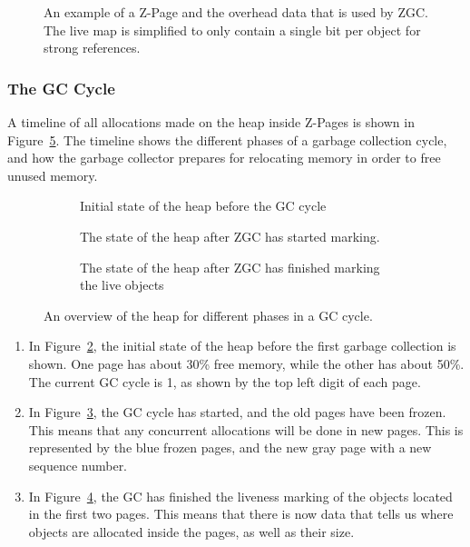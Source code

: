 \begin{figure}[H]
    \centering
    
    \caption[]
    {An example of a Z-Page and the overhead data that is used by ZGC. The live map is simplified to only contain a single bit per object for strong references.} 
    \label{fig:zpages}
\end{figure}

\subsubsection{The GC Cycle}

A timeline of all allocations made on the heap inside Z-Pages is shown in Figure~\ref{fig:zgc_timeline}. The timeline shows the different phases of a garbage collection cycle, and how the garbage collector prepares for relocating memory in order to free unused memory.

\begin{figure}[H]
    \centering
    \begin{subfigure}[t]{.214\textwidth}
        \centering
        
        \caption{Initial state of the heap before the GC cycle}
        \label{fig:zrel1}
    \end{subfigure}%
    \hfill\vline\hfill
    \begin{subfigure}[t]{.32\textwidth}
        \centering
        
        \caption{The state of the heap after ZGC has started marking.}
        \label{fig:zrel2}
    \end{subfigure}%
    \hfill\vline\hfill
    \begin{subfigure}[t]{.32\textwidth}
        \centering
        
        \caption{The state of the heap after ZGC has finished marking the live objects}
        \label{fig:zrel3}
    \end{subfigure}%
    \caption{An overview of the heap for different phases in a GC cycle.}
    \label{fig:zgc_timeline}
\end{figure}

\begin{enumerate}
    \item In Figure~\ref*{fig:zrel1}, the initial state of the heap before the first garbage collection is shown. One page has about 30\% free memory, while the other has about 50\%. The current GC cycle is 1, as shown by the top left digit of each page.
    \item In Figure~\ref*{fig:zrel2}, the GC cycle has started, and the old pages have been frozen. This means that any concurrent allocations will be done in new pages. This is represented by the blue frozen pages, and the new gray page with a new sequence number.
    \item In Figure~\ref*{fig:zrel3}, the GC has finished the liveness marking of the objects located in the first two pages. This means that there is now data that tells us where objects are allocated inside the pages, as well as their size.
\end{enumerate}

